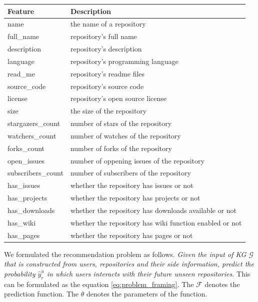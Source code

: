 \documentclass[11pt,twoside]{report}
\begin{document}
\begin{center}
    \begin{tabular}{l | l}
    \hline
    Feature & Description \\
    \hline
    name & the name of a repository \\
    full\_name & repository's full name \\
    description & repository's description \\
    language & repository's programming language \\
    read\_me & repository's readme files \\
    source\_code & repository's source code \\
    license & repository's open source license \\
    size & the size of the repository \\
    stargazers\_count & number of stars of the repository \\
    watchers\_count & number of watches of the repository \\
    forks\_count & number of forks of the repository \\
    open\_issues & number of oppening issues of the repository \\
    subscribers\_count & number of subscribers of the repository \\
    has\_issues & whether the repository has issues or not \\
    has\_projects & whether the repository has projects or not \\
    has\_downloads & whether the repository has downloads available or not \\
    has\_wiki & whether the repository has wiki function enabled or not \\
    has\_pages & whether the repository has pages or not \\
    \end{tabular}
    \label{tab:repo_features}
\end{center}

We formulated the recommendation problem as follows. \textit{Given the input of KG $\mathcal{G}$ that is constructed from users, repositories and their side information, predict the probability $\hat{y}_r^u$ in which users interacts with their future unseen repositories.} This can be formulated as the equation \ref{eq:problem_framing}. The $\mathcal{F}$ denotes the prediction function. The $\theta$ denotes the parameters of the function.
\end{document}

